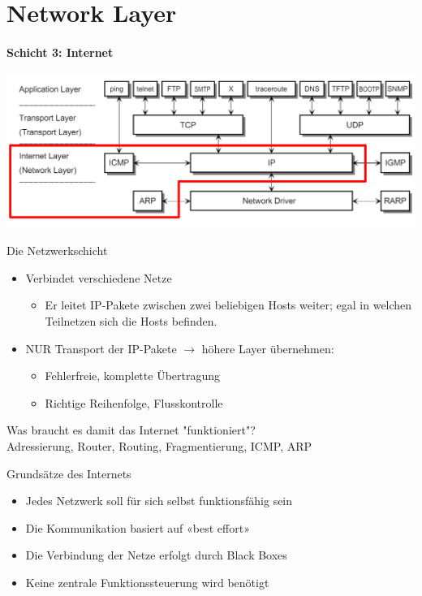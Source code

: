\section{Network Layer}
\paragraph{Schicht 3: Internet}

\includegraphics[width=1\linewidth]{images/orientierung_network_layer.png}

\begin{definition}{Die Netzwerkschicht}
    \begin{itemize}
        \item Verbindet verschiedene Netze
        \begin{itemize}
            \item Er leitet IP-Pakete zwischen zwei beliebigen Hosts weiter; egal in welchen Teilnetzen sich die Hosts befinden.
        \end{itemize}
        \item NUR Transport der IP-Pakete $\rightarrow$ höhere Layer übernehmen:
        \begin{itemize}
            \item Fehlerfreie, komplette Übertragung
            \item Richtige Reihenfolge, Flusskontrolle
        \end{itemize}
    \end{itemize}
\end{definition}

\begin{concept}{Was braucht es damit das Internet "funktioniert"?}\\
    Adressierung, Router, Routing, Fragmentierung, ICMP, ARP
\end{concept}

\begin{lemma}{Grundsätze des Internets}
    \begin{itemize}
        \item Jedes Netzwerk soll für sich selbst funktionsfähig sein
        \item Die Kommunikation basiert auf «best effort»
        \item Die Verbindung der Netze erfolgt durch Black Boxes
        \item Keine zentrale Funktionssteuerung wird benötigt
    \end{itemize}
\end{lemma}

